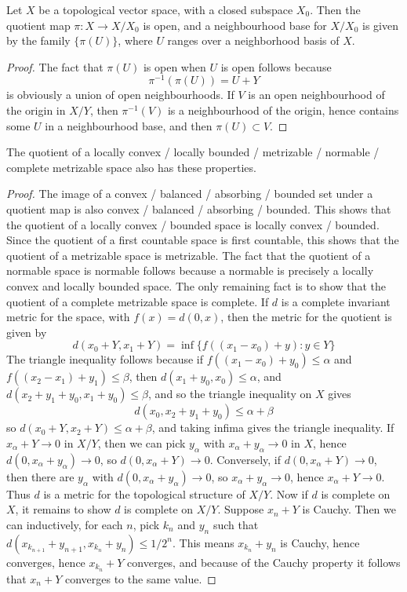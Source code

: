 \begin{theorem}
    Let $X$ be a topological vector space, with a closed subspace $X_0$. Then the quotient map $\pi: X \to X/X_0$ is open, and a neighbourhood base for $X/X_0$ is given by the family $\{ \pi(U) \}$, where $U$ ranges over a neighborhood basis of $X$.
\end{theorem}
\begin{proof}
    The fact that $\pi(U)$ is open when $U$ is open follows because
    \[ \pi^{-1}(\pi(U)) = U + Y \]
    is obviously a union of open neighbourhoods. If $V$ is an open neighbourhood of the origin in $X/Y$, then $\pi^{-1}(V)$ is a neighbourhood of the origin, hence contains some $U$ in a neighbourhood base, and then $\pi(U) \subset V$.
\end{proof}

\begin{theorem}
    The quotient of a locally convex / locally bounded / metrizable / normable / complete metrizable space also has these properties.
\end{theorem}
\begin{proof}
    The image of a convex / balanced / absorbing / bounded set under a quotient map is also convex / balanced / absorbing / bounded. This shows that the quotient of a locally convex / bounded space is locally convex / bounded. Since the quotient of a first countable space is first countable, this shows that the quotient of a metrizable space is metrizable. The fact that the quotient of a normable space is normable follows because a normable is precisely a locally convex and locally bounded space. The only remaining fact is to show that the quotient of a complete metrizable space is complete. If $d$ is a complete invariant metric for the space, with $f(x) = d(0,x)$, then the metric for the quotient is given by
    \[ d(x_0 + Y, x_1 + Y) = \inf \{ f((x_1 - x_0) + y) : y \in Y \} \]
    The triangle inequality follows because if $f((x_1 - x_0) + y_0) \leq \alpha$ and $f((x_2 - x_1) + y_1) \leq \beta$, then $d(x_1 + y_0, x_0) \leq \alpha$, and $d(x_2 + y_1 + y_0, x_1 + y_0) \leq \beta$, and so the triangle inequality on $X$ gives
    \[ d(x_0, x_2 + y_1 + y_0) \leq \alpha + \beta \]
    so $d(x_0 + Y, x_2 + Y) \leq \alpha + \beta$, and taking infima gives the triangle inequality. If $x_\alpha + Y \to 0$ in $X/Y$, then we can pick $y_\alpha$ with $x_\alpha + y_\alpha \to 0$ in $X$, hence $d(0, x_\alpha + y_\alpha) \to 0$, so $d(0,x_\alpha + Y) \to 0$. Conversely, if $d(0,x_\alpha + Y) \to 0$, then there are $y_\alpha$ with $d(0, x_\alpha + y_\alpha) \to 0$, so $x_\alpha + y_\alpha \to 0$, hence $x_\alpha + Y \to 0$. Thus $d$ is a metric for the topological structure of $X/Y$. Now if $d$ is complete on $X$, it remains to show $d$ is complete on $X/Y$. Suppose $x_n + Y$ is Cauchy. Then we can inductively, for each $n$, pick $k_n$ and $y_n$ such that $d(x_{k_{n+1}} + y_{n+1}, x_{k_n} + y_n) \leq 1/2^n$. This means $x_{k_n} + y_n$ is Cauchy, hence converges, hence $x_{k_n} + Y$ converges, and because of the Cauchy property it follows that $x_n + Y$ converges to the same value.
\end{proof}

